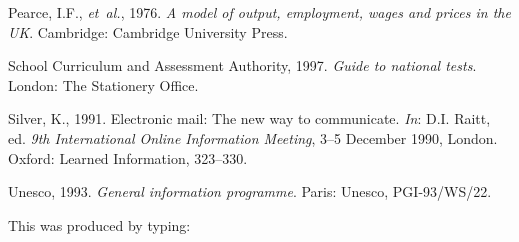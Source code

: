 \documentclass[]{interact}
\theoremstyle{plain}%
\theoremstyle{definition}
\theoremstyle{remark}
\begin{document}
\begin{thebibliography}{}
Pearce, I.F., \emph{et~al.}, 1976. \emph{A model of output, employment, wages
  and prices in the UK}. Cambridge: Cambridge University Press.

School Curriculum and Assessment Authority, 1997. \emph{Guide to national
  tests}. London: The Stationery Office.

Silver, K., 1991. Electronic mail: The new way to communicate. \emph{In}: D.I.
  Raitt, ed. \emph{9th International Online Information Meeting}, 3--5 December
  1990, London. Oxford: Learned Information, 323--330.

Unesco, 1993. \emph{General information programme}. Paris: Unesco,
  PGI-93/WS/22.

\end{thebibliography}
\bigskip
\noindent This was produced by typing:
\end{document}
